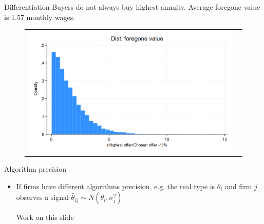 \documentclass[10pt,aspectratio=169]{beamer}
\begin{document}
\begin{frame}{Differentiation}\label{slide:fig2}    
Buyers do not always buy highest annuity. Average foregone value is 1.57 monthly wages.
\begin{figure}[H]
\centering{}%
\begin{tabular}{cc}
\includegraphics[scale=0.25]{../figures/IE3/IE3_foregone_hist.png}
\end{tabular}
\end{figure}
\hyperlink{slide:Descriptive_evidence}{}
\end{frame}


\begin{frame}{Algorithm precision} 
    \begin{itemize}
        \item If firms have different algorithms precision, e.g. the real type is $\theta_i$ and firm $j$ observes a signal $\hat{\theta}_{ij} \sim N(\theta_i, \sigma_j^2)$  

        \item [Work on this slide ]
    \end{itemize}
\end{frame}


\end{document}
